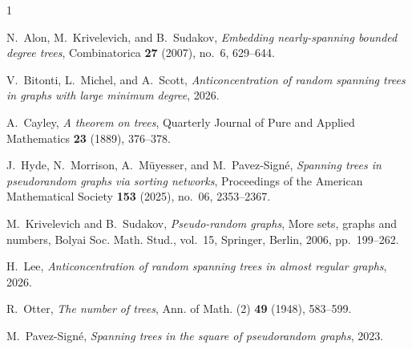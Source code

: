 \documentclass[reqno,final,a4paper]{amsart}
\numberwithin{equation}{section}
\theoremstyle{definition}
\theoremstyle{remark}
\begin{document}
\begin{thebibliography}{1}

N.~Alon, M.~Krivelevich, and B.~Sudakov, \emph{Embedding nearly-spanning bounded degree trees}, Combinatorica \textbf{27} (2007), no.~6, 629--644.

V.~Bitonti, L.~Michel, and A.~Scott, \emph{Anticoncentration of random spanning trees in graphs with large minimum degree}, 2026.

A.~Cayley, \emph{A theorem on trees}, Quarterly Journal of Pure and Applied Mathematics \textbf{23} (1889), 376--378.

J.~Hyde, N.~Morrison, A.~M{\"u}yesser, and M.~Pavez-Sign{\'e}, \emph{Spanning trees in pseudorandom graphs via sorting networks}, Proceedings of the American Mathematical Society \textbf{153} (2025), no.~06, 2353--2367.

M.~Krivelevich and B.~Sudakov, \emph{Pseudo-random graphs}, More sets, graphs and numbers, Bolyai Soc. Math. Stud., vol.~15, Springer, Berlin, 2006, pp.~199--262.

H.~Lee, \emph{Anticoncentration of random spanning trees in almost regular graphs}, 2026.

R.~Otter, \emph{The number of trees}, Ann. of Math. (2) \textbf{49} (1948), 583--599.

M.~Pavez-Signé, \emph{Spanning trees in the square of pseudorandom graphs}, 2023.

\end{thebibliography}
\end{document}
